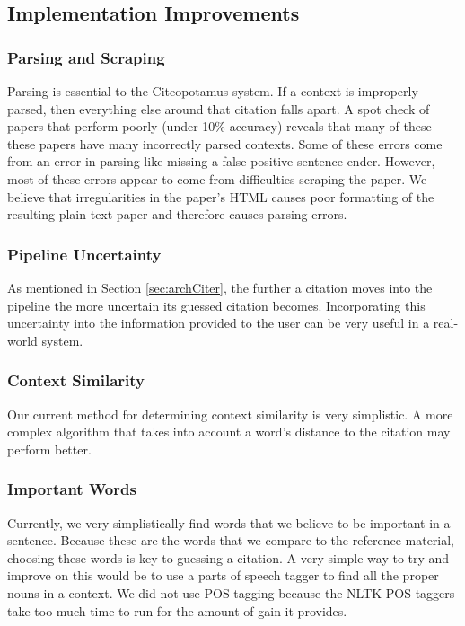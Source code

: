 \documentclass[10pt, conference, compsocconf]{IEEEtran}
\begin{document}
\subsection{Implementation Improvements}

\subsubsection{Parsing and Scraping}
Parsing is essential to the Citeopotamus system. If a context is improperly parsed, then everything else around that citation falls apart.
A spot check of papers that perform poorly (under 10\% accuracy) reveals that many of these these papers have many incorrectly parsed contexts.
Some of these errors come from an error in parsing like missing a false positive sentence ender. However, most of these errors appear to
come from difficulties scraping the paper. We believe that irregularities in the paper's HTML causes poor formatting of the resulting
plain text paper and therefore causes parsing errors.

\subsubsection{Pipeline Uncertainty}
As mentioned in Section \ref{sec:archCiter}, the further a citation moves into the pipeline the more uncertain its guessed citation becomes.
Incorporating this uncertainty into the information provided to the user can be very useful in a real-world system.

\subsubsection{Context Similarity}
Our current method for determining context similarity is very simplistic. A more complex algorithm that takes into account a word's distance to the
citation may perform better.

\subsubsection{Important Words}
Currently, we very simplistically find words that we believe to be important in a sentence. Because these are the words that
we compare to the reference material, choosing these words is key to guessing a citation. A very simple way to try and improve on this
would be to use a parts of speech tagger to find all the proper nouns in a context. We did not use POS tagging because
the NLTK POS taggers take too much time to run for the amount of gain it provides.
\end{document}
